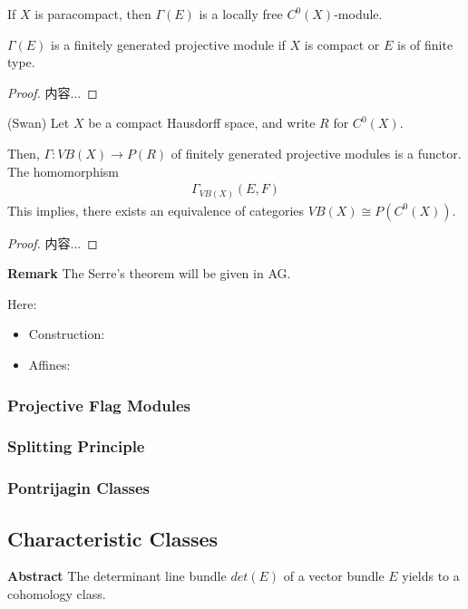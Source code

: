 \documentclass[Total.tex]{subfiles}
\begin{document}
	\begin{corollary}
		If $X$ is paracompact, then $\Gamma(E)$ is a locally free $C^0(X)$-module. 
		
		$\Gamma(E)$ is a finitely generated projective module if $X$ is compact or $E$ is of finite type.
	\end{corollary}
	
	\begin{proof}
		内容...
	\end{proof}
	
	\begin{theorem}
		(Swan) Let $X$ be a compact Hausdorff space, and write $R$ for $C^0(X)$. 
		
		Then, $\Gamma:VB(X)\rightarrow P(R)$ of finitely generated projective modules is a functor. The homomorphism
		\begin{gather*}
			\Gamma_{VB(X)} (E,F)
		\end{gather*}
		This implies, there exists an equivalence of categories $VB(X)\cong P(C^0(X))$. 
	\end{theorem}
	\begin{proof}
		内容...
	\end{proof}
	
	\textbf{Remark} The Serre's theorem will be given in AG.
	
	Here:
	\begin{itemize}
		\item Construction:
		\item Affines:
	\end{itemize}
	
	\subsubsection{Projective Flag Modules}
	
	\subsubsection{Splitting Principle}
	
	\subsubsection{Pontrijagin Classes}
	\subsection{Characteristic Classes}
	
	\textbf{Abstract} The determinant line bundle $det(E)$ of a vector bundle $E$ yields to a cohomology class. 
	
\end{document}
